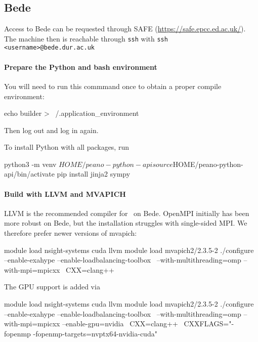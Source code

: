 


\subsection{Bede}


Access to Bede can be requested through SAFE
(\url{https://safe.epcc.ed.ac.uk/}).
The machine then is reachable through \texttt{ssh} with \texttt{ssh
<username>@bede.dur.ac.uk}


\paragraph{Prepare the Python and bash environment}

You will need to run this commmand once to obtain a proper compile environment:
\begin{code}
echo builder > ~/.application_environment
\end{code}
Then log out and log in again.


To install Python with all packages, run
\begin{code}
python3 -m venv $HOME/peano-python-api
source $HOME/peano-python-api/bin/activate
pip install jinja2 sympy
\end{code}


\paragraph{Build with LLVM and MVAPICH}


LLVM is the recommended compiler for \Peano\ on Bede. 
OpenMPI initially has been more robust on Bede, but the installation struggles
with single-sided MPI. 
We therefore prefer newer versions of mvapich:

\begin{code}
module load nsight-systems cuda llvm
module load mvapich2/2.3.5-2 
./configure --enable-exahype --enable-loadbalancing-toolbox \
 --with-multithreading=omp  --with-mpi=mpicxx \
 CXX=clang++
\end{code}

\noindent
The GPU support is added via 
\begin{code}
module load nsight-systems cuda llvm
module load mvapich2/2.3.5-2 
./configure --enable-exahype --enable-loadbalancing-toolbox \
 --with-multithreading=omp  --with-mpi=mpicxx --enable-gpu=nvidia \
 CXX=clang++ \
 CXXFLAGS="-fopenmp -fopenmp-targets=nvptx64-nvidia-cuda"
\end{code}


